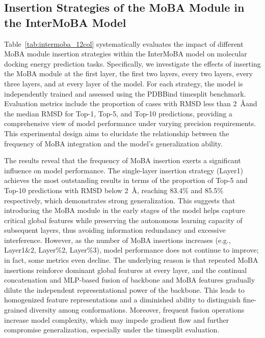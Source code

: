 \documentclass[11pt,a4paper]{article}
\begin{document}
\subsection{Insertion Strategies of the MoBA Module in the InterMoBA Model}
Table~\ref{tab:intermoba_12col} systematically evaluates the impact of different MoBA module insertion strategies within the InterMoBA model on molecular docking energy prediction tasks. Specifically, we investigate the effects of inserting the MoBA module at the first layer, the first two layers, every two layers, every three layers, and at every layer of the model. For each strategy, the model is independently trained and assessed using the PDBBind timesplit benchmark. Evaluation metrics include the proportion of cases with RMSD less than 2~\AA and the median RMSD for Top-1, Top-5, and Top-10 predictions, providing a comprehensive view of model performance under varying precision requirements. This experimental design aims to elucidate the relationship between the frequency of MoBA integration and the model's generalization ability.

The results reveal that the frequency of MoBA insertion exerts a significant influence on model performance. The single-layer insertion strategy (Layer1) achieves the most outstanding results in terms of the proportion of Top-5 and Top-10 predictions with RMSD below 2~\AA, reaching 83.4\% and 85.5\% respectively, which demonstrates strong generalization. This suggests that introducing the MoBA module in the early stages of the model helps capture critical global features while preserving the autonomous learning capacity of subsequent layers, thus avoiding information redundancy and excessive interference. However, as the number of MoBA insertions increases (e.g., Layer1\&2, Layer\%2, Layer\%3), model performance does not continue to improve; in fact, some metrics even decline. The underlying reason is that repeated MoBA insertions reinforce dominant global features at every layer, and the continual concatenation and MLP-based fusion of backbone and MoBA features gradually dilute the independent representational power of the backbone. This leads to homogenized feature representations and a diminished ability to distinguish fine-grained diversity among conformations. Moreover, frequent fusion operations increase model complexity, which may impede gradient flow and further compromise generalization, especially under the timesplit evaluation.
\end{document}
